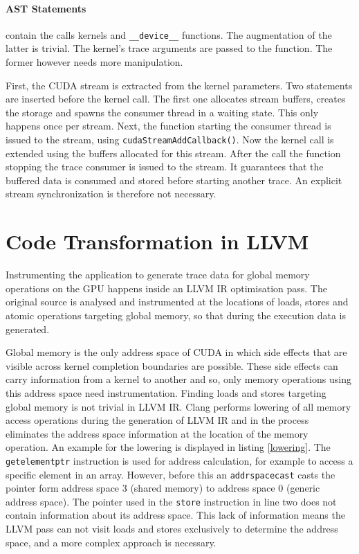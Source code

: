 \paragraph{AST Statements} contain the calls kernels and \verb|__device__| functions. The augmentation of the latter is trivial. The kernel's trace arguments are passed to the function. The former however needs more manipulation.

First, the CUDA stream is extracted from the kernel parameters. Two statements are inserted before the kernel call. The first one allocates stream buffers, creates the storage and spawns the consumer thread in a waiting state. This only happens once per stream. Next, the function starting the consumer thread  is issued to the stream, using \verb|cudaStreamAddCallback()|. Now the kernel call is extended using the buffers allocated for this stream. After the call the function stopping the trace consumer is issued to the stream. It guarantees that
the buffered data is consumed and stored before starting another trace.
An explicit stream synchronization is therefore not necessary.

\section{Code Transformation in LLVM}\label{impl:llvm}
Instrumenting the application to generate trace data for global memory operations on the GPU happens inside an LLVM IR optimisation pass. The original source is analysed and instrumented at the locations of loads, stores and atomic operations targeting global memory, so that during the execution data is generated.

Global memory is the only address space of CUDA in which side effects that are visible across kernel completion boundaries are possible. These side effects can carry information from a kernel to another and so, only memory operations using this address space need instrumentation. Finding loads and stores targeting global memory is not trivial in LLVM IR. Clang performs lowering of all memory access operations during the generation of LLVM IR and in the process eliminates the address space information at the location of the memory operation. An example for the lowering is displayed in listing \ref{lowering}. The \verb|getelementptr| instruction is used for address calculation, for example to access a specific element in an array. However, before this an \verb|addrspacecast| casts the pointer form address space 3 (shared memory) to address space 0 (generic address space). The pointer used in the \verb|store| instruction in line two does not contain information about its address space. This lack of information means the LLVM pass can not visit loads and stores exclusively to determine the address space, and a more complex approach is necessary.
 
